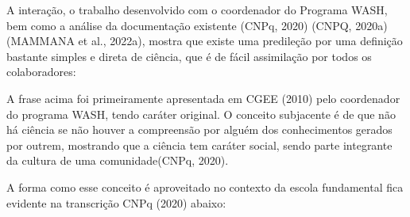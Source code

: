 \documentclass[
12pt,		%
openright,	%
twoside,  %
a4paper,			%
chapter=TITLE,		%
english,			%
french,				%
spanish,			%
brazil				%
]{USPSC-classe/USPSC}
\begin{document}
A intera\c{c}\~ao, o trabalho desenvolvido com o coordenador do Programa WASH, bem como a an\'alise da documenta\c{c}\~ao existente  (CNPq, 2020)  (CNPQ, 2020a)  (MAMMANA et al., 2022a), mostra que existe uma predile\c{c}\~ao por uma defini\c{c}\~ao bastante simples e direta de ci\^encia, que \'e de f\'acil assimila\c{c}\~ao por todos os colaboradores:









\noindent\begin{center}\mbox{\centering{}}\end{center}


A frase acima foi primeiramente apresentada em  CGEE (2010) pelo coordenador do programa WASH, tendo car\'ater original. O conceito subjacente \'e de que \textquotedbl n\~ao h\'a ci\^encia se n\~ao houver a compreens\~ao por algu\'em dos conhecimentos gerados por outrem, mostrando que a ci\^encia tem car\'ater social, sendo parte integrante da cultura de uma comunidade\textquotedbl   (CNPq, 2020).








A forma como esse conceito \'e aproveitado no contexto da escola fundamental fica evidente na transcri\c{c}\~ao  CNPq (2020) abaixo:









\noindent\begin{center}\mbox{\centering{}}\end{center}
\end{document}
